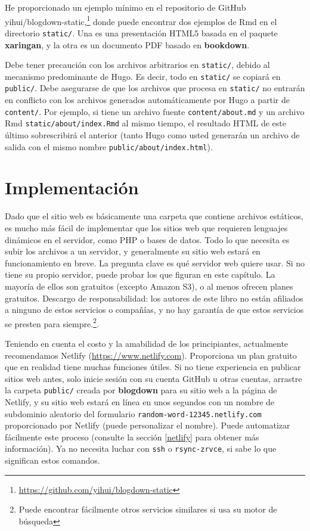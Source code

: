 \documentclass[12pt,]{krantz}
\renewcommand{\href}[2]{#2\footnote{\url{#1}}}
\theoremstyle{definition}
\theoremstyle{definition}
\theoremstyle{definition}
\theoremstyle{remark}
\begin{document}
He proporcionado un ejemplo mínimo en el repositorio de GitHub
\href{https://github.com/yihui/blogdown-static}{yihui/blogdown-static,}
donde puede encontrar dos ejemplos de Rmd en el directorio
\texttt{static/}. Una es una presentación HTML5 basada en el paquete
\textbf{xaringan}, y la otra es un documento PDF basado en
\textbf{bookdown}.

Debe tener precaución con los archivos arbitrarios en \texttt{static/},
debido al mecanismo predominante de Hugo. Es decir, todo en
\texttt{static/} se copiará en \texttt{public/}. Debe asegurarse de que
los archivos que procesa en \texttt{static/} no entrarán en conflicto
con los archivos generados automáticamente por Hugo a partir de
\texttt{content/}. Por ejemplo, si tiene un archivo fuente
\texttt{content/about.md} y un archivo Rmd
\texttt{static/about/index.Rmd} al mismo tiempo, el resultado HTML de
este último sobrescribirá el anterior (tanto Hugo como usted generarán
un archivo de salida con el mismo nombre
\texttt{public/about/index.html}).

\hypertarget{implementacion}{%
\chapter{Implementación}\label{implementacion}}

Dado que el sitio web es básicamente una carpeta que contiene archivos
estáticos, es mucho más fácil de implementar que los sitios web que
requieren lenguajes dinámicos en el servidor, como PHP o bases de datos.
Todo lo que necesita es subir los archivos a un servidor, y generalmente
su sitio web estará en funcionamiento en breve. La pregunta clave es qué
servidor web quiere usar. Si no tiene su propio servidor, puede probar
los que figuran en este capítulo. La mayoría de ellos son gratuitos
(excepto Amazon S3), o al menos ofrecen planes gratuitos. Descargo de
responsabilidad: los autores de este libro no están afiliados a ninguno
de estos servicios o compañías, y no hay garantía de que estos servicios
se presten para siempre.\footnote{Puede encontrar fácilmente otros
  servicios similares si usa su motor de búsqueda}.

Teniendo en cuenta el costo y la amabilidad de los principiantes,
actualmente recomendamos Netlify (\url{https://www.netlify.com}).
Proporciona un plan gratuito que en realidad tiene muchas funciones
útiles. Si no tiene experiencia en publicar sitios web antes, solo
inicie sesión con su cuenta GitHub u otras cuentas, arrastre la carpeta
\texttt{public/} creada por \textbf{blogdown} para su sitio web a la
página de Netlify, y su sitio web estará en línea en unos segundos con
un nombre de subdominio aleatorio del formulario
\texttt{random-word-12345.netlify.com} proporcionado por Netlify (puede
personalizar el nombre). Puede automatizar fácilmente este proceso
(consulte la sección \ref{netlify} para obtener más información). Ya no
necesita luchar con \texttt{ssh} o \texttt{rsync-zrvce}, si sabe lo que
significan estos comandos.
\end{document}
